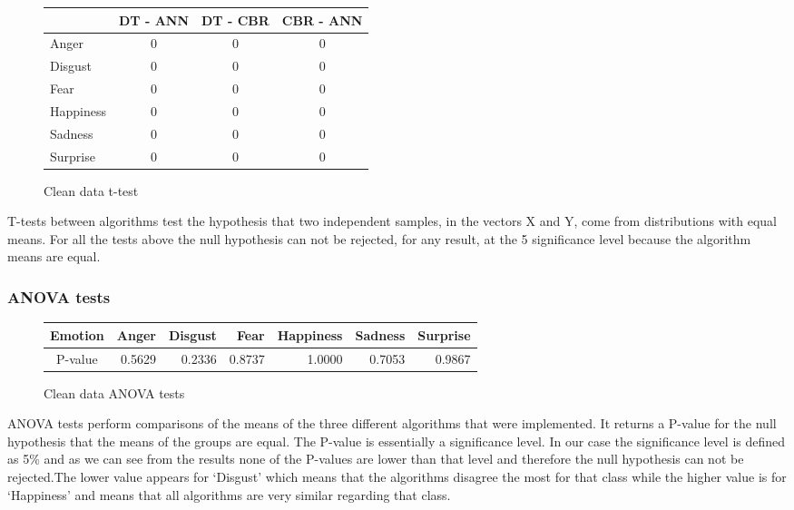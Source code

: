 \documentclass[a4paper,11pt]{article}
\begin{document}
\begin{figure}[h]
    \begin{center}
    \begin{tabular}{|l ||c|c|c|} \hline
    & DT - ANN & DT - CBR & CBR - ANN\\ \hline \hline
    Anger & 0 & 0 & 0 \\ \hline
    Disgust & 0 & 0 & 0 \\ \hline
    Fear & 0 & 0 & 0 \\ \hline
    Happiness & 0 & 0 & 0 \\ \hline
    Sadness & 0 & 0 & 0 \\ \hline
    Surprise & 0 & 0 & 0 \\ \hline
    \end{tabular}
    \caption{Clean data t-test}
    \label{fig:TTest}
    \end{center}
\end{figure}

T-tests between algorithms test the hypothesis that two independent samples, in
the vectors X and Y, come from distributions with equal means. For all the
tests above the null hypothesis can not be rejected, for any result, at the 5%
significance level because the algorithm means are equal. 

\subsubsection{ANOVA tests}

\begin{figure}[h]
    \begin{center}
    \begin{tabular}{|c||r|r|r|r|r|r|} \hline 
    Emotion & Anger & Disgust & Fear & Happiness & Sadness & Surprise \\ \hline \hline
    P-value & 0.5629 & 0.2336 & 0.8737 & 1.0000 & 0.7053 & 0.9867 \\ \hline
    \end{tabular}
    \caption{Clean data ANOVA tests}
    \end{center}
\end{figure}

ANOVA tests perform comparisons of the means of the three different algorithms
that were implemented. It returns a P-value for the null hypothesis that the
means of the groups are equal. The P-value is essentially a significance level.
In our case the significance level is defined as 5\% and as we can see from the
results none of the P-values are lower than that level and therefore the null
hypothesis can not be rejected.The lower value appears for `Disgust’ which
means that the algorithms disagree the most for that class while the higher
value is for `Happiness’ and means that all algorithms are very similar
regarding that class.
\end{document}
